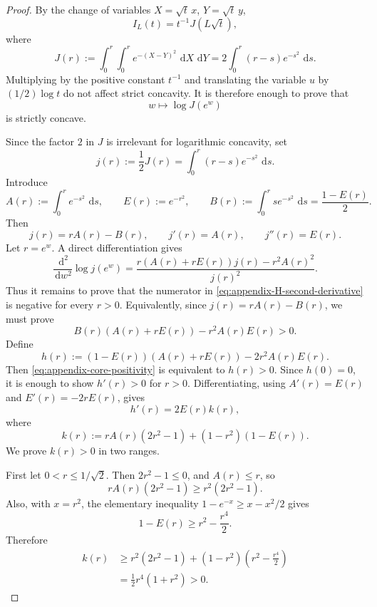 \documentclass[11pt]{article}
\newcommand{\dd}{\,\mathrm{d}}
\begin{document}
\begin{proof}
By the change of variables \(X=\sqrt t\,x\), \(Y=\sqrt t\,y\),
\[
    I_L(t)=t^{-1}J(L\sqrt t),
\]
where
\[
    J(r):=\int_0^r\int_0^r e^{-(X-Y)^2}\,\dd X\,\dd Y
    =2\int_0^r(r-s)e^{-s^2}\,\dd s.
\]
Multiplying by the positive constant \(t^{-1}\) and translating the variable
\(u\) by \((1/2)\log t\) do not affect strict concavity.  It is therefore
enough to prove that
\[
    w\longmapsto \log J(e^w)
\]
is strictly concave.

Since the factor \(2\) in \(J\) is irrelevant for logarithmic concavity, set
\[
    j(r):=\frac{1}{2}J(r)=\int_0^r(r-s)e^{-s^2}\,\dd s.
\]
Introduce
\[
    A(r):=\int_0^r e^{-s^2}\,\dd s,
    \qquad
    E(r):=e^{-r^2},
    \qquad
    B(r):=\int_0^r s e^{-s^2}\,\dd s=\frac{1-E(r)}{2}.
\]
Then
\[
    j(r)=rA(r)-B(r),
    \qquad
    j'(r)=A(r),
    \qquad
    j''(r)=E(r).
\]
Let \(r=e^w\).  A direct differentiation gives
\begin{equation}
    \frac{\dd^2}{\dd w^2}\log j(e^w)
    =
    \frac{r(A(r)+rE(r))j(r)-r^2A(r)^2}{j(r)^2}.
    \label{eq:appendix-H-second-derivative}
\end{equation}
Thus it remains to prove that the numerator in
\eqref{eq:appendix-H-second-derivative} is negative for every \(r>0\).
Equivalently, since \(j(r)=rA(r)-B(r)\), we must prove
\begin{equation}
    B(r)(A(r)+rE(r))-r^2A(r)E(r)>0.
    \label{eq:appendix-core-positivity}
\end{equation}
Define
\[
    h(r):=(1-E(r))(A(r)+rE(r))-2r^2A(r)E(r).
\]
Then \eqref{eq:appendix-core-positivity} is equivalent to \(h(r)>0\).  Since
\(h(0)=0\), it is enough to show \(h'(r)>0\) for \(r>0\).  Differentiating,
using \(A'(r)=E(r)\) and \(E'(r)=-2rE(r)\), gives
\begin{equation}
    h'(r)=2E(r)k(r),
    \label{eq:appendix-h-prime}
\end{equation}
where
\begin{equation}
    k(r):=rA(r)(2r^2-1)+(1-r^2)(1-E(r)).
    \label{eq:appendix-k-definition}
\end{equation}
We prove \(k(r)>0\) in two ranges.

First let \(0<r\leq 1/\sqrt2\).  Then \(2r^2-1\leq0\), and
\(A(r)\leq r\), so
\[
    rA(r)(2r^2-1)
    \geq
    r^2(2r^2-1).
\]
Also, with \(x=r^2\), the elementary inequality
\(1-e^{-x}\geq x-x^2/2\) gives
\[
    1-E(r)\geq r^2-\frac{r^4}{2}.
\]
Therefore
\[
\begin{split}
    k(r)
    &\geq
    r^2(2r^2-1)
    +(1-r^2)\left(r^2-\frac{r^4}{2}\right)  \\
    &=
    \frac12 r^4(1+r^2)>0.
\end{split}
\]


\end{proof}
\end{document}
